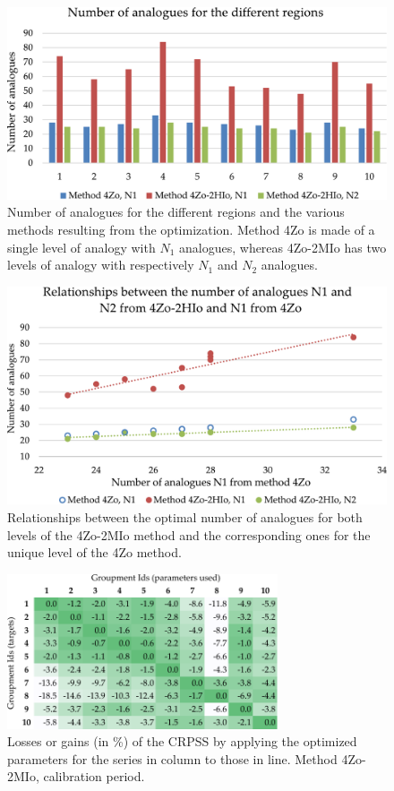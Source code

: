 \documentclass[5p]{elsarticle}
\begin{document}
\begin{figure}[htb]
	\centerline{\includegraphics[width=\linewidth]{figures/figure_nb_analogues.pdf}}
	\caption{Number of analogues for the different regions and the various methods resulting from the optimization. Method 4Zo is made of a single level of analogy with $N_{1}$ analogues, whereas 4Zo-2MIo has two levels of analogy with respectively $N_{1}$ and $N_{2}$ analogues.}
	\label{fig:figure_nb_analogues}
\end{figure}

\begin{figure}[htb]
	\centerline{\includegraphics[width=\linewidth]{figures/figure_nb_analogues_relationships.pdf}}
	\caption{Relationships between the optimal number of analogues for both levels of the 4Zo-2MIo method and the corresponding ones for the unique level of the 4Zo method.}
	\label{fig:figure_nb_analogues_relationships}
\end{figure}

\begin{figure}[htb]
	\centerline{\includegraphics[width=8cm]{figures/table_crossing_z4-hi2_calib.pdf}}
	\caption{Losses or gains (in \%) of the CRPSS by applying the optimized parameters for the series in column to those in line. Method 4Zo-2MIo, calibration period.}
	\label{fig:crossing_4Zo-2MIo_calib}
\end{figure}
\end{document}
